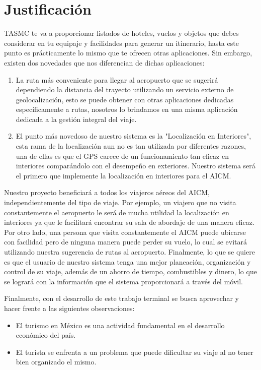 \section{Justificación}

TASMC te va a proporcionar listados de hoteles, vuelos y objetos que debes considerar en tu equipaje y facilidades para generar un itinerario, hasta este punto es prácticamente lo mismo que te ofrecen otras aplicaciones. Sin embargo, existen dos novedades que nos diferencian de dichas aplicaciones:

\begin{enumerate}
	\item La ruta más conveniente para llegar al aeropuerto que se sugerirá dependiendo la distancia del  trayecto utilizando un servicio externo de geolocalización, esto se puede obtener con otras aplicaciones dedicadas específicamente a rutas, nosotros lo brindamos en una misma aplicación dedicada a la gestión integral del viaje.
	\item El punto más novedoso de nuestro sistema es la "Localización en Interiores", esta rama de la localización aun no es tan utilizada por diferentes razones, una de ellas es que el GPS carece de un funcionamiento tan eficaz en interiores comparándolo con el desempeño en exteriores. Nuestro sistema será el primero que implemente la localización en interiores para el AICM.  
\end{enumerate}

Nuestro proyecto beneficiará a todos los viajeros aéreos del AICM, independientemente del tipo de viaje. Por ejemplo, un viajero que no visita constantemente el aeropuerto le será de mucha utilidad la localización en interiores ya que le facilitará encontrar su sala de abordaje de una manera eficaz. Por otro lado, una persona que visita constantemente el AICM puede ubicarse con facilidad pero de ninguna manera puede perder su vuelo, lo cual se evitará utilizando nuestra sugerencia de rutas al aeropuerto. Finalmente, lo que se quiere es que el usuario de nuestro sistema tenga una mejor planeación, organización y control de su viaje, además de un ahorro de tiempo, combustibles y dinero, lo que se logrará con la información que el sistema proporcionará a través del móvil.
 
Finalmente, con el desarrollo de este trabajo terminal se busca aprovechar y hacer frente a las siguientes observaciones:

\begin{itemize}
	\item El turismo en México es una actividad fundamental en el desarrollo económico del país.
	\item El turista se enfrenta a un problema que puede dificultar su viaje al no tener bien organizado el mismo.
\end{itemize}

